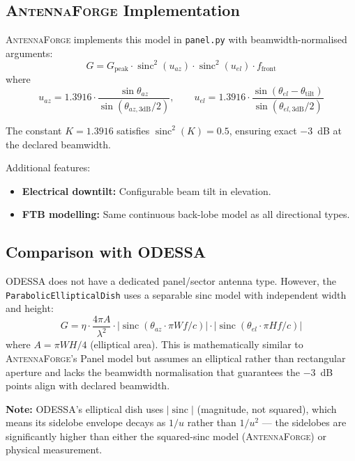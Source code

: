 \documentclass[11pt,a4paper]{article}
\newcommand{\AF}{\textsc{AntennaForge}}
\newcommand{\OD}{\textsc{ODESSA}}
\newcommand{\sinc}{\operatorname{sinc}}
\newcommand{\caveat}[1]{\par\noindent\colorbox{highlightyellow}{\parbox{\dimexpr\linewidth-2\fboxsep\relax}{\textbf{Note:} #1}}\par\medskip}
\begin{document}
\subsection{\AF{} Implementation}

\AF{} implements this model in \texttt{panel.py} with beamwidth-normalised
arguments:
\begin{equation}
  G = G_\text{peak} \cdot \sinc^2(u_{az}) \cdot \sinc^2(u_{el}) \cdot
    f_\text{front}
\end{equation}
where
\[
  u_{az} = 1.3916 \cdot \frac{\sin\theta_{az}}{\sin(\theta_{az,3\text{dB}}/2)},
  \qquad
  u_{el} = 1.3916 \cdot
    \frac{\sin(\theta_{el} - \theta_\text{tilt})}
         {\sin(\theta_{el,3\text{dB}}/2)}
\]

The constant $K = 1.3916$ satisfies $\sinc^2(K) = 0.5$, ensuring exact $-3$~dB
at the declared beamwidth.

Additional features:
\begin{itemize}[leftmargin=2em]
  \item \textbf{Electrical downtilt:} Configurable beam tilt in elevation.
  \item \textbf{FTB modelling:} Same continuous back-lobe model as all
    directional types.
\end{itemize}

\subsection{Comparison with \OD{}}

\OD{} does not have a dedicated panel/sector antenna type.  However, the
\texttt{ParabolicEllipticalDish} uses a separable sinc model with independent
width and height:
\begin{equation}
  G = \eta \cdot \frac{4\pi A}{\lambda^2} \cdot
    |\sinc(\theta_{az} \cdot \pi W f / c)| \cdot
    |\sinc(\theta_{el} \cdot \pi H f / c)|
\end{equation}
where $A = \pi W H / 4$ (elliptical area).  This is mathematically similar to
\AF{}'s Panel model but assumes an elliptical rather than rectangular aperture
and lacks the beamwidth normalisation that guarantees the $-3$~dB points align
with declared beamwidth.

\caveat{\OD{}'s elliptical dish uses $|\sinc|$ (magnitude, not squared),
which means its sidelobe envelope decays as $1/u$ rather than $1/u^2$ --- the
sidelobes are significantly higher than either the squared-sinc model (\AF{}) or
physical measurement.}
\end{document}
